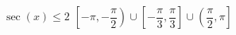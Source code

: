 { $\sec \left( x \right) \leq 2$ }
{ $\left[ -\pi, -\dfrac{\pi}{2} \right) \cup \left[ -\dfrac{\pi}{3}, \dfrac{\pi}{3} \right] \cup \left( \dfrac{\pi}{2}, \pi \right]$}
